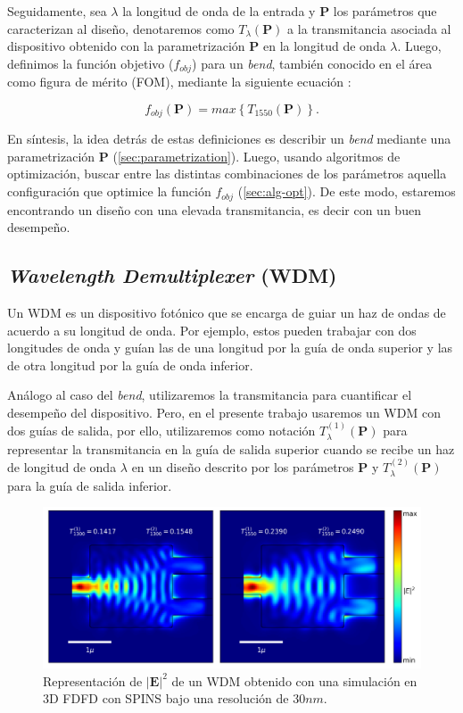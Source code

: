 Seguidamente, sea $\lambda$ la longitud de onda de la entrada y $\boldsymbol{P}$ los parámetros que caracterizan al
diseño, denotaremos como $T_{\lambda}(\boldsymbol{P})$ a la transmitancia asociada al dispositivo obtenido con la
parametrización $\boldsymbol{P}$ en la longitud de onda $\lambda$. Luego, definimos la función objetivo 
($f_{obj}$) para un \emph{bend}, también conocido en el área como figura de mérito (FOM), 
mediante la siguiente ecuación \citep{Su2020}:

\begin{equation}
  f_{obj}(\boldsymbol{P}) = max \left \{ T_{1550} (\boldsymbol{P}) \right \}.
\label{eq:fom-bend}
\end{equation}

En síntesis, la idea detrás de estas definiciones es describir un \emph{bend} mediante una parametrización
$\boldsymbol{P}$
(\autoref{sec:parametrization}).
Luego, usando algoritmos de optimización, buscar entre las distintas combinaciones de los parámetros aquella configuración
que optimice la función $f_{obj}$ (\autoref{sec:alg-opt}).
De este modo, estaremos encontrando un diseño con una elevada transmitancia, es decir con un buen desempeño.

\subsection{\emph{Wavelength Demultiplexer} (WDM)}

Un WDM es un dispositivo fotónico que se encarga de guiar un haz de ondas de acuerdo a su longitud de onda.
Por ejemplo, estos pueden trabajar con dos longitudes de onda y guían las de una longitud por la guía de onda superior
y las de otra longitud por la guía de onda inferior.

Análogo al caso del \emph{bend}, utilizaremos la transmitancia para cuantificar el desempeño del dispositivo.
Pero, en el presente trabajo usaremos un WDM con dos guías de salida, por ello, utilizaremos como notación
$T_{\lambda}^{(1)}(\boldsymbol{P})$ para
representar la transmitancia en la guía de salida superior cuando se recibe un haz de longitud de onda
$\lambda$ en un diseño descrito por los parámetros $\boldsymbol{P}$ y $T_{\lambda}^{(2)}(\boldsymbol{P})$ para la guía de salida inferior.

\begin{figure}[ht]
  \centering
  \includegraphics[scale=0.7]{image/theory/wdm_field_dx30_px16_px16.png}
  \caption{Representación de $|\boldsymbol{E}|^2$ de un WDM obtenido con una simulación en 3D FDFD con SPINS bajo una resolución de $30 nm$.}
  \label{fig:efield-wdm}
\end{figure}


